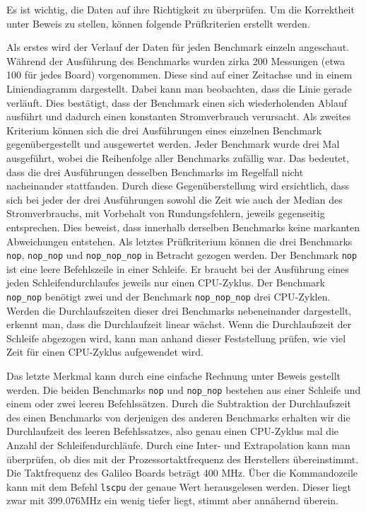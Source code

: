 Es ist wichtig, die Daten auf ihre Richtigkeit zu überprüfen. Um die Korrektheit unter Beweis zu stellen, können folgende Prüfkriterien erstellt werden.
\par
Als erstes wird der Verlauf der Daten für jeden Benchmark einzeln angeschaut. Während der Ausführung des Benchmarks wurden zirka 200 Messungen (etwa 100 für jedes Board) vorgenommen. Diese sind auf einer Zeitachse und in einem Liniendiagramm dargestellt. Dabei kann man beobachten, dass die Linie gerade verläuft. Dies bestätigt, dass der Benchmark einen sich wiederholenden Ablauf ausführt und dadurch einen konstanten Stromverbrauch verursacht. Als zweites Kriterium können sich die drei Ausführungen eines einzelnen Benchmark gegenübergestellt und ausgewertet werden. Jeder Benchmark wurde drei Mal ausgeführt, wobei die Reihenfolge aller Benchmarks zufällig war. Das bedeutet, dass die drei Ausführungen desselben Benchmarks im Regelfall nicht nacheinander stattfanden. Durch diese Gegenüberstellung wird ersichtlich, dass sich bei jeder der drei Ausführungen sowohl die Zeit wie auch der Median des Stromverbrauchs, mit Vorbehalt von Rundungsfehlern, jeweils gegenseitig entsprechen. Dies beweist, dass innerhalb derselben Benchmarks keine markanten Abweichungen entstehen. Als letztes Prüfkriterium können die drei Benchmarks \texttt{nop}, \texttt{nop\_nop} und \texttt{nop\_nop\_nop} in Betracht gezogen werden. Der Benchmark \texttt{nop} ist eine leere Befehlszeile in einer Schleife. Er braucht bei der Ausführung eines jeden Schleifendurchlaufes jeweils nur einen CPU-Zyklus. Der Benchmark \texttt{nop\_nop} benötigt zwei und der Benchmark \texttt{nop\_nop\_nop} drei CPU-Zyklen. Werden die Durchlaufszeiten dieser drei Benchmarks nebeneinander dargestellt, erkennt man, dass die Durchlaufzeit linear wächst. Wenn die Durchlaufszeit der Schleife abgezogen wird, kann man anhand dieser Feststellung prüfen, wie viel Zeit für einen CPU-Zyklus aufgewendet wird.
\par
Das letzte Merkmal kann durch eine einfache Rechnung unter Beweis gestellt werden. Die beiden Benchmarks \texttt{nop} und \texttt{nop\_nop} bestehen aus einer Schleife und einem oder zwei leeren Befehlssätzen. Durch die Subtraktion der Durchlaufszeit des einen Benchmarks von derjenigen des anderen Benchmarks erhalten wir die Durchlaufzeit des leeren Befehlssatzes, also genau einen CPU-Zyklus mal die Anzahl der Schleifendurchläufe. Durch eine Inter- und Extrapolation kann man überprüfen, ob dies mit der Prozessortaktfrequenz des Herstellers übereinstimmt. Die Taktfrequenz des Galileo Boards beträgt 400 MHz. Über die Kommandozeile kann mit dem Befehl \texttt{lscpu} der genaue Wert herausgelesen werden. Dieser liegt zwar mit 399.076MHz ein wenig tiefer liegt, stimmt aber annähernd überein.

